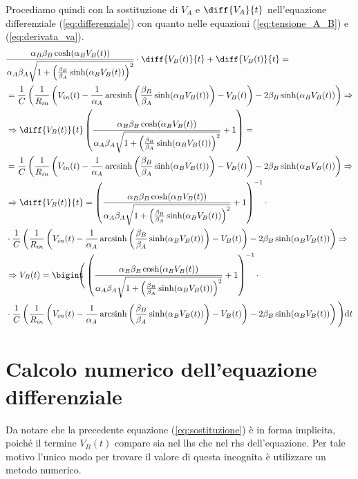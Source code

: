 		Procediamo quindi con la sostituzione di $V_{A}$ e $\diff{V_{A}}{t}$ nell'equazione differenziale (\ref{eq:differenziale}) con quanto nelle equazioni (\ref{eq:tensione_A_B}) e (\ref{eq:derivata_va}).
		\begin{equation}
			\label{eq:integrale}
			\begin{split}
				&\frac{\alpha_{B}\beta_{B}\cosh(\alpha_{B}V_{B}(t))}{\alpha_{A}\beta_{A}\sqrt{1+\left(\frac{\beta_{B}}{\beta_{A}}\sinh(\alpha_{B}V_{B}(t))\right)^{2}}}\cdot\diff{V_{B}(t)}{t}+\diff{V_{B}(t)}{t} =\\&= \frac{1}{C}\left(\frac{1}{R_{in}}\left(V_{in}(t)-\frac{1}{\alpha_{A}} \arcsinh \left(\frac{\beta_{B}}{\beta_{A}} \sinh(\alpha_{B}V_{B}(t))\right)-V_{B}(t)\right)-2\beta_{B}\sinh(\alpha_{B}V_{B}(t))\right)\Rightarrow\\
				&\Rightarrow \diff{V_{B}(t)}{t}\left(\frac{\alpha_{B}\beta_{B}\cosh(\alpha_{B}V_{B}(t))}{\alpha_{A}\beta_{A}\sqrt{1+\left(\frac{\beta_{B}}{\beta_{A}}\sinh(\alpha_{B}V_{B}(t))\right)^{2}}}+1\right) =\\&= \frac{1}{C}\left(\frac{1}{R_{in}}\left(V_{in}(t)-\frac{1}{\alpha_{A}} \arcsinh \left(\frac{\beta_{B}}{\beta_{A}} \sinh(\alpha_{B}V_{B}(t))\right)-V_{B}(t)\right)-2\beta_{B}\sinh(\alpha_{B}V_{B}(t))\right)\Rightarrow\\
				&\Rightarrow \diff{V_{B}(t)}{t} = \left(\frac{\alpha_{B}\beta_{B}\cosh(\alpha_{B}V_{B}(t))}{\alpha_{A}\beta_{A}\sqrt{1+\left(\frac{\beta_{B}}{\beta_{A}}\sinh(\alpha_{B}V_{B}(t))\right)^{2}}}+1\right)^{-1}\cdot\\&\cdot\frac{1}{C}\left(\frac{1}{R_{in}}\left(V_{in}(t)-\frac{1}{\alpha_{A}} \arcsinh \left(\frac{\beta_{B}}{\beta_{A}} \sinh(\alpha_{B}V_{B}(t))\right)-V_{B}(t)\right)-2\beta_{B}\sinh(\alpha_{B}V_{B}(t))\right)\Rightarrow\\
				&\Rightarrow V_{B}(t) = \Int{\Bigg(\left(\frac{\alpha_{B}\beta_{B}\cosh(\alpha_{B}V_{B}(t))}{\alpha_{A}\beta_{A}\sqrt{1+\left(\frac{\beta_{B}}{\beta_{A}}\sinh(\alpha_{B}V_{B}(t))\right)^{2}}}+1\right)^{-1}\cdot\\&\cdot\frac{1}{C}\left(\frac{1}{R_{in}}\left(V_{in}(t)-\frac{1}{\alpha_{A}} \arcsinh \left(\frac{\beta_{B}}{\beta_{A}} \sinh(\alpha_{B}V_{B}(t))\right)-V_{B}(t)\right)-2\beta_{B}\sinh(\alpha_{B}V_{B}(t))\right)\Bigg)}{t}\\
			\end{split}
		\end{equation}
		\pagebreak
		
	\section{Calcolo numerico dell'equazione differenziale}
		Da notare che la precedente equazione (\ref{eq:sostituzione}) è in forma implicita, poiché il termine $V_{B}(t)$ compare sia nel lhs che nel rhs dell'equazione. Per tale motivo l'unico modo per trovare il valore di questa incognita è utilizzare un metodo numerico.
		
